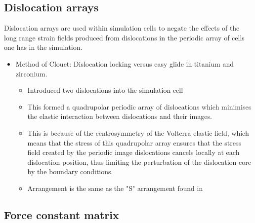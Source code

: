 \documentclass[11pt]{article}
\begin{document}
\subsection{Dislocation arrays}
\label{sec:org40012b6}
Dislocation arrays are used within simulation cells to negate the effects of
the long range strain fields produced from dislocations in the periodic array
of cells one has in the simulation.
\begin{itemize}
\item Method of Clouet: Dislocation locking versus easy glide in titanium and
zirconium. \cite{Clouet2015}
\begin{itemize}
\item Introduced two dislocations into the simulation cell
\item This formed a quadrupolar periodic array of dislocations which
minimises the elastic interaction between dislocations and their
images.
\item This is because of the centrosymmetry of the Volterra elastic field,
which means that the stress of this quadrupolar array ensures that the
stress field created by the periodic image dislocations cancels locally
at each dislocation position, thus limiting the perturbation of the
dislocation core by the boundary conditions.
\item Arrangement is the same as the "S" arrangement found in
\cite{Clouet2012}
\end{itemize}
\end{itemize}

\subsection{Force constant matrix}
\label{sec:orgdce6002}
\end{document}
